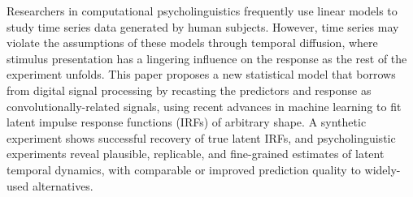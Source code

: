 Researchers in computational psycholinguistics frequently use linear models to study time series data generated by human subjects. However, time series may violate the assumptions of these models through temporal diffusion, where stimulus presentation has a lingering influence on the response as the rest of the experiment unfolds. This paper proposes a new statistical model that borrows from digital signal processing by recasting the predictors and response as convolutionally-related signals, using recent advances in machine learning to fit latent impulse response functions (IRFs) of arbitrary shape. A synthetic experiment shows successful recovery of true latent IRFs, and psycholinguistic experiments reveal plausible, replicable, and fine-grained estimates of latent temporal dynamics, with comparable or improved prediction quality to widely-used alternatives.
